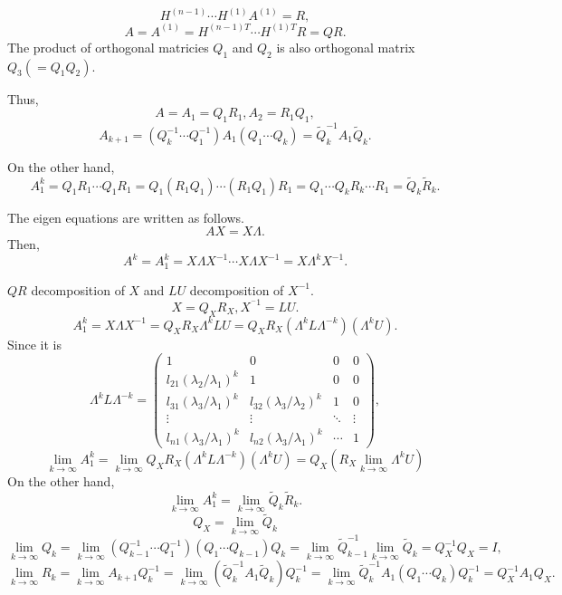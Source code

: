 \documentclass[dvipdfmx]{article}
\begin{document}
$$
H^{(n-1)} {\cdots} H^{(1)} A^{(1)} = R,
$$
$$
A = A^{(1)} = H^{(n-1)T} {\cdots} H^{(1)T} R = QR.
$$
The product of orthogonal matricies $Q_1$ and $Q_2$ is also orthogonal matrix $Q_3(=Q_1Q_2)$.

Thus,
$$
A = A_1 = Q_1R_1, A_2 = R_1Q_1,
$$
$$
A_{k+1} = (Q_k^{-1}{\cdots}Q_1^{-1}) A_1 (Q_1{\cdots}Q_k) = {\tilde{Q}}_k^{-1}A_1{\tilde{Q}}_k.
$$

On the other hand,
$$
A_1^k = Q_1R_1 {\cdots} Q_1R_1 = Q_1(R_1Q_1){\cdots}(R_1Q_1)R_1 = Q_1{\cdots}Q_k R_k{\cdots}R_1 = {\tilde{Q}}_k {\tilde{R}}_k.
$$

The eigen equations are written as follows.
$$
AX=X{\Lambda}.
$$
Then,
$$
A^k = A_1^k = X{\Lambda}X^{-1} {\cdots} X{\Lambda}X^{-1} = X{\Lambda}^kX^{-1}.
$$

$QR$ decomposition of $X$ and $LU$ decomposition of $X^{-1}$.
$$
X = Q_XR_X, X^{^-1} = LU.
$$
$$
A_1^k = X{\Lambda}X^{-1} = Q_XR_X {\Lambda}^k LU = Q_XR_X ({\Lambda}^k L {\Lambda}^{-k})({\Lambda}^kU).
$$
Since it is
$$
{\Lambda}^k L {\Lambda}^{-k} =
\left(
\begin{array}{cccc}
1                                  & 0                                 & 0      & 0      \\
l_{21}({\lambda}_2/{\lambda}_1)^k  & 1                                 & 0      & 0      \\
l_{31}({\lambda}_3/{\lambda}_1)^k  & l_{32}({\lambda}_3/{\lambda}_2)^k & 1      & 0      \\
\vdots                             & \vdots                            & \ddots & \vdots \\
l_{n1}({\lambda}_3/{\lambda}_1)^k  & l_{n2}({\lambda}_3/{\lambda}_1)^k & \cdots & 1
\end{array}
\right),
$$
$$
{\lim_{k{\rightarrow}{\infty}}} A_1^k 
= {\lim_{k{\rightarrow}{\infty}}} Q_XR_X ({\Lambda}^k L {\Lambda}^{-k})({\Lambda}^kU) 
= Q_X(R_X {\lim_{k{\rightarrow}{\infty}}} {\Lambda}^k U)
$$
On the other hand,
$$
{\lim_{k{\rightarrow}{\infty}}} A_1^k = {\lim_{k{\rightarrow}{\infty}}} {\tilde{Q}}_k {\tilde{R}}_k.
$$
$$
Q_X = {\lim_{k{\rightarrow}{\infty}}} {\tilde{Q}}_k
$$
$$
{\lim_{k{\rightarrow}{\infty}}} Q_k 
= {\lim_{k{\rightarrow}{\infty}}} (Q_{k-1}^{-1}{\cdots}Q_{1}^{-1}) (Q_{1}{\cdots}Q_{k-1}) Q_k
= {\lim_{k{\rightarrow}{\infty}}} {\tilde{Q}}_{k-1}^{-1} {\lim_{k{\rightarrow}{\infty}}} {\tilde{Q}}_{k}
= Q_X^{-1}Q_X
= I,
$$
$$
{\lim_{k{\rightarrow}{\infty}}} R_k
= {\lim_{k{\rightarrow}{\infty}}} A_{k+1}Q_k^{-1}
= {\lim_{k{\rightarrow}{\infty}}} ({\tilde{Q}}_k^{-1}A_1{\tilde{Q}}_k)Q_k^{-1}
= {\lim_{k{\rightarrow}{\infty}}} {\tilde{Q}}_k^{-1}A_1(Q_1{\cdots}Q_k)Q_k^{-1}
= Q_X^{-1}A_1Q_X.
$$
\end{document}
